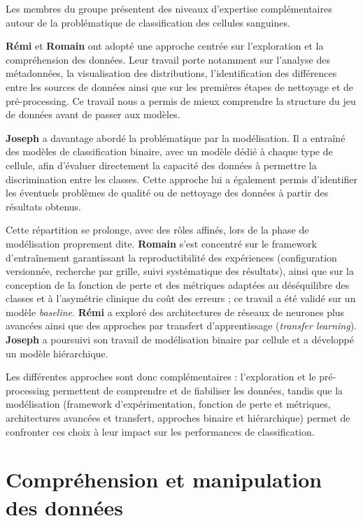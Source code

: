 Les membres du groupe présentent des niveaux d’expertise complémentaires autour de la problématique de classification des cellules sanguines.

\textbf{Rémi} et \textbf{Romain} ont adopté une approche centrée sur l’exploration et la compréhension des données.
Leur travail porte notamment sur l’analyse des métadonnées, la visualisation des distributions, l’identification des différences entre les sources de données ainsi que sur les premières étapes de nettoyage et de pré-processing.
Ce travail nous a permis de mieux comprendre la structure du jeu de données avant de passer aux modèles.

\textbf{Joseph} a davantage abordé la problématique par la modélisation.
Il a entraîné des modèles de classification binaire, avec un modèle dédié à chaque type de cellule, afin d’évaluer directement la capacité des données à permettre la discrimination entre les classes.
Cette approche lui a également permis d'identifier les éventuels problèmes de qualité ou de nettoyage des données à partir des résultats obtenus.

Cette répartition se prolonge, avec des rôles affinés, lors de la phase de modélisation proprement dite.
\textbf{Romain} s’est concentré sur le framework d’entraînement garantissant la reproductibilité des expériences (configuration versionnée, recherche par grille, suivi systématique des résultats), ainsi que sur la conception de la fonction de perte et des métriques adaptées au déséquilibre des classes et à l’asymétrie clinique du coût des erreurs ; ce travail a été validé sur un modèle \emph{baseline}.
\textbf{Rémi} a exploré des architectures de réseaux de neurones plus avancées ainsi que des approches par transfert d’apprentissage (\emph{transfer learning}).
\textbf{Joseph} a poursuivi son travail de modélisation binaire par cellule et a développé un modèle hiérarchique.

Les différentes approches sont donc complémentaires : l’exploration et le pré-processing permettent de comprendre et de fiabiliser les données, tandis que la modélisation (framework d’expérimentation, fonction de perte et métriques, architectures avancées et transfert, approches binaire et hiérarchique) permet de confronter ces choix à leur impact sur les performances de classification.


\section{Compréhension et manipulation des données}
